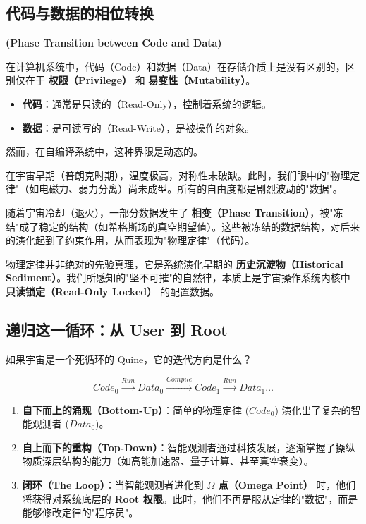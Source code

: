 \subsection{代码与数据的相位转换}

\textbf{(Phase Transition between Code and Data)}

在计算机系统中，代码（Code）和数据（Data）在存储介质上是没有区别的，区别仅在于 \textbf{权限（Privilege）} 和 \textbf{易变性（Mutability）}。

\begin{itemize}
\item \textbf{代码}：通常是只读的（Read-Only），控制着系统的逻辑。

\item \textbf{数据}：是可读写的（Read-Write），是被操作的对象。
\end{itemize}

然而，在自编译系统中，这种界限是动态的。

在宇宙早期（普朗克时期），温度极高，对称性未破缺。此时，我们眼中的"物理定律"（如电磁力、弱力分离）尚未成型。所有的自由度都是剧烈波动的"数据"。

随着宇宙冷却（退火），一部分数据发生了 \textbf{相变（Phase Transition）}，被"冻结"成了稳定的结构（如希格斯场的真空期望值）。这些被冻结的数据结构，对后来的演化起到了约束作用，从而表现为"物理定律"（代码）。

\begin{theorem}[定律冻结定理]
物理定律并非绝对的先验真理，它是系统演化早期的 \textbf{历史沉淀物（Historical Sediment）}。我们所感知的"坚不可摧"的自然律，本质上是宇宙操作系统内核中 \textbf{只读锁定（Read-Only Locked）} 的配置数据。
\end{theorem}

\subsection{递归这一循环：从 User 到 Root}

如果宇宙是一个死循环的 Quine，它的迭代方向是什么？

\begin{equation}
Code_0 \xrightarrow{Run} Data_0 \xrightarrow{Compile} Code_1 \xrightarrow{Run} Data_1 \dots
\end{equation}

\begin{enumerate}
\item \textbf{自下而上的涌现（Bottom-Up）}：简单的物理定律 ($Code_0$) 演化出了复杂的智能观测者 ($Data_0$)。

\item \textbf{自上而下的重构（Top-Down）}：智能观测者通过科技发展，逐渐掌握了操纵物质深层结构的能力（如高能加速器、量子计算、甚至真空衰变）。

\item \textbf{闭环（The Loop）}：当智能观测者进化到 \textbf{$\Omega$ 点（Omega Point）} 时，他们将获得对系统底层的 \textbf{Root 权限}。此时，他们不再是服从定律的"数据"，而是能够修改定律的"程序员"。
\end{enumerate}


